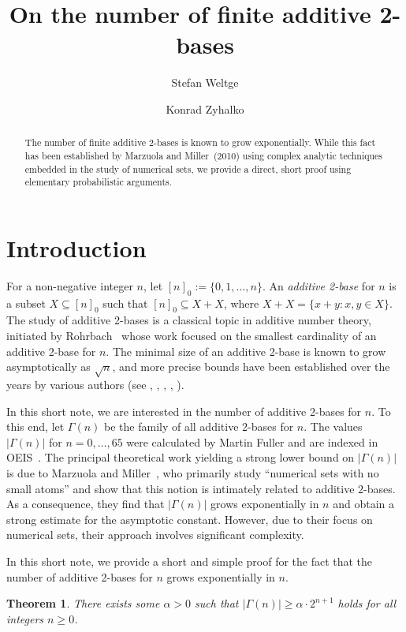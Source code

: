 \documentclass{article}
\title{On the number of finite additive 2-bases}
\author{Stefan Weltge}
\author{Konrad Zyhalko}
\affil{\small \it Technical University of Munich, Germany}
\date{}
\newtheorem{theorem}{Theorem}[section]
\begin{document}
\maketitle

\begin{abstract}
    The number of finite additive 2-bases is known to grow exponentially. While this fact has been established by Marzuola and Miller~(2010) using complex analytic techniques embedded in the study of numerical sets, we provide a direct, short proof using elementary probabilistic arguments.
\end{abstract}

\section{Introduction}

For a non-negative integer $n$, let $[n]_0 := \{0,1,\dots,n\}$.
An \emph{additive 2-base} for $n$ is a subset $X \subseteq [n]_0$ such that $[n]_0 \subseteq X + X$, where $X + X = \{x + y : x,y \in X\}$.
The study of additive 2-bases is a classical topic in additive number theory, initiated by Rohrbach~\cite{Rohrbach} whose work focused on the smallest cardinality of an additive 2-base for $n$.
The minimal size of an additive 2-base is known to grow asymptotically as $\sqrt{n}$, and more precise bounds have been established over the years by various authors (see \cite{HammererHofmeister}, \cite{Mrose}, \cite{Moser}, \cite{GunturkNathanson}, \cite{Yu}).

In this short note, we are interested in the number of additive 2-bases for $n$.
To this end, let $\Gamma(n)$ be the family of all additive 2-bases for $n$.
The values $|\Gamma(n)|$ for $n = 0,\dots,65$ were calculated by Martin Fuller and are indexed in OEIS~\cite[A066062]{oeis}.
The principal theoretical work yielding a strong lower bound on $|\Gamma(n)|$ is due to Marzuola and Miller~\cite{MarzuolaMiller}, who primarily study ``numerical sets with no small atoms'' and show that this notion is intimately related to additive $2$-bases.
As a consequence, they find that $|\Gamma(n)|$ grows exponentially in $n$ and obtain a strong estimate for the asymptotic constant.
However, due to their focus on numerical sets, their approach involves significant complexity.

In this short note, we provide a short and simple proof for the fact that the number of additive 2-bases for $n$ grows exponentially in $n$.

\begin{theorem}
    \label{thmMain}
    There exists some $\alpha > 0$ such that $|\Gamma(n)| \ge \alpha \cdot 2^{n+1}$ holds for all integers $n \ge 0$.
\end{theorem}
\end{document}
